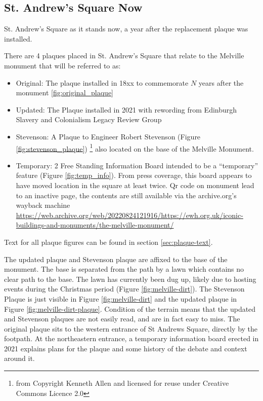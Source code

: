 \documentclass{scrartcl}
\begin{document}
\subsection{St. Andrew's Square Now}

St. Andrew's Square as it stands now, a year after the replacement plaque was installed.

There are 4 plaques placed in St. Andrew's Square that relate to the Melville monument that will be referred to as: 

\begin{itemize}
    \item Original: The plaque installed in 18xx to commemorate $N$ years after the monument \ref{fig:original_plaque}
    \item Updated: The Plaque installed in 2021 with rewording from Edinburgh Slavery and Colonialism Legacy Review Group
    \item Stevenson: A Plaque to Engineer Robert Stevenson (Figure \ref{fig:stevenson_plaque}) \footnote{from Copyright Kenneth Allen and licensed for reuse under Creative Commons Licence 2.0} also located on the base of the Melville Monument.
    \item Temporary: 2 Free Standing Information Board intended to be a ``temporary'' feature (Figure \ref{fig:temp_info}). From press coverage, this board appears to have moved location in the square at least twice. Qr code on monument lead to an inactive page, the contents are still available via the archive.org's wayback machine \url{https://web.archive.org/web/20220824121916/https://ewh.org.uk/iconic-buildings-and-monuments/the-melville-monument/}
\end{itemize}

Text for all plaque figures can be found in section \ref{sec:plaque-text}.

The updated plaque and Stevenson plaque are affixed to the base of the monument. The base is separated from the path by a lawn which contains no clear path to the base. The lawn has currently been dug up, likely due to hosting events during the Christmas period (Figure \ref{fig:melville-dirt}). The Stevenson Plaque is just visible in Figure \ref{fig:melville-dirt} and the updated plaque in Figure \ref{fig:melville-dirt-plaque}. Condition of the terrain means that the updated and Stevenson plaques are not easily read, and are in fact easy to miss. The original plaque sits to the western entrance of St Andrews Square, directly by the footpath. At the northeastern entrance, a temporary information board erected in 2021 explains plans for the plaque and some history of the debate and context around it.
\end{document}
